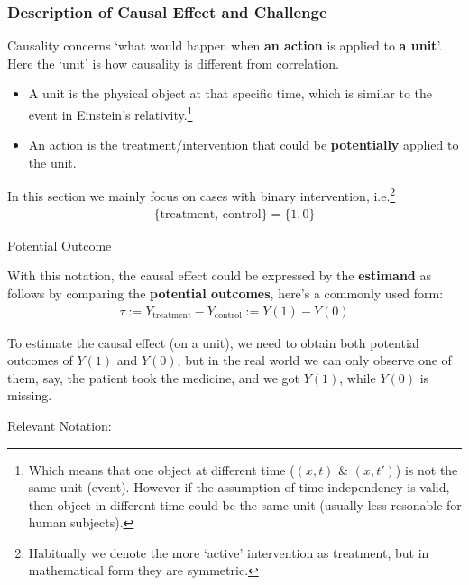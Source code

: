 \subsubsection{Description of Causal Effect and Challenge}
    Causality concerns `what would happen when \textbf{an action} is applied to \textbf{a unit}'. Here the `unit' is how causality is different from correlation.
\begin{itemize}[topsep=2pt,itemsep=0pt]
    \item A unit is the physical object at that specific time, which is similar to the event in Einstein's relativity.\footnote{Which means that one object at different time ($ (x,t) $ \& $ (x,t') $) is not the same unit (event). However if the assumption of time independency is valid, then object in different time could be the same unit (usually less resonable for human subjects).}
    \item An action is the treatment/intervention that could be \textbf{potentially} applied to the unit. 
\end{itemize}

    In this section we mainly focus on cases with binary intervention, i.e.\footnote{Habitually we denote the more `active' intervention as treatment, but in mathematical form they are symmetric.}
    \begin{align*}
        \{\mathrm{treatment},\,\mathrm{control} \}=\{1,0\} 
    \end{align*}

\begin{point}
    Potential Outcome
\end{point}

    With this notation, the causal effect could be expressed by the \textbf{estimand} as follows by  comparing the \textbf{potential outcomes}, here's a commonly used form:
    \begin{align*}
        \tau:=Y_\mathrm{treatment} -Y_\mathrm{control} :=Y(1)-Y(0)
    \end{align*}

    To estimate the causal effect (on a unit), we need to obtain both potential outcomes of $ Y(1) $ and $ Y(0) $, but in the real world we can only observe one of them, say, the patient took the medicine, and we got $ Y(1) $, while $ Y(0) $ is missing.

    Relevant Notation:


